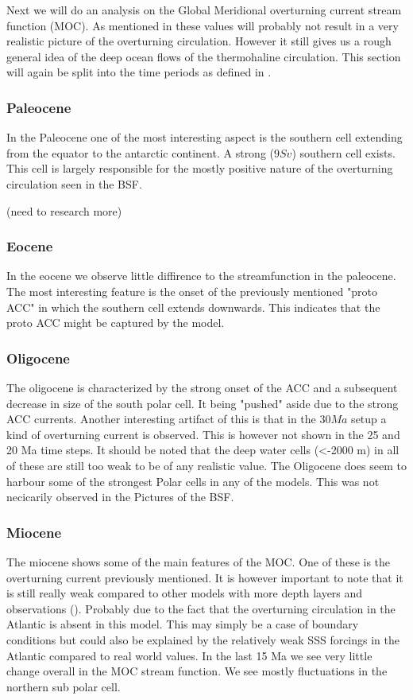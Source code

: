 Next we will do an analysis on the Global Meridional overturning current stream function (MOC). As mentioned in  these values will probably not result in a very realistic picture of the overturning circulation. However it still gives us a rough general idea of the deep ocean flows of the thermohaline circulation. This section will again be split into the time periods as defined in .

\subsubsection{Paleocene}
In the Paleocene one of the most interesting aspect is the southern cell extending from the equator to the antarctic continent. A strong ($9 Sv$) southern cell exists. This cell is largely responsible for the mostly positive nature of the overturning circulation seen in the BSF.

(need to research more)


\subsubsection{Eocene}
In the eocene we observe little diffirence to the streamfunction in the paleocene. The most interesting feature is the onset of the previously mentioned "proto ACC" in which the southern cell extends downwards. This indicates that the proto ACC might be captured by the model.


\subsubsection{Oligocene}
The oligocene is characterized by the strong onset of the ACC and a subsequent decrease in size of the south polar cell. It being "pushed" aside due to the strong ACC currents. Another interesting artifact of this is that in the $30 Ma$ setup a kind of overturning current is observed. This is however not shown in the 25 and 20 Ma time steps. It should be noted that the deep water cells (<-2000 m) in all of these are still too weak to be of any realistic value. The Oligocene does seem to harbour some of the strongest Polar cells in any of the models. This was not necicarily observed in the Pictures of the BSF.

\subsubsection{Miocene}

The miocene shows some of the main features of the MOC. One of these is the overturning current previously mentioned. It is however important to note that it is still really weak compared to other models with more depth layers and observations (\cite{von2006effect}). Probably due to the fact that the overturning circulation in the Atlantic is absent in this model. This may simply be a case of boundary conditions but could also be explained by the relatively weak SSS forcings in the Atlantic compared to real world values. In the last 15 Ma we see very little change overall in the MOC stream function. We see mostly fluctuations in the northern sub polar cell. 